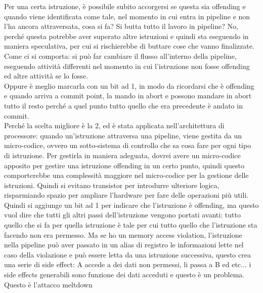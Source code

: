 \documentclass[12pt, oneside]{extbook}
\begin{document}
Per una certa istruzione, è possibile subito accorgersi se questa sia offending e quando viene identificata come tale, nel momento in cui entra in pipeline e non l'ha ancora attraversata, cosa si fa? Si butta tutto il lavoro in pipeline? No, perché questa potrebbe aver superato altre istruzioni e quindi sta eseguendo in maniera speculativa, per cui si rischierebbe di buttare cose che vanno finalizzate. Come ci si comporta: si può far cambiare il flusso all'interno della pipeline, eseguendo attività differenti nel momento in cui l'istruzione non fosse offending ed altre attività se lo fosse.\\ Oppure è meglio marcarla con un bit ad 1, in modo da ricordarsi che è offending e quando arriva a commit point, la mando in abort e possono mandare in abort tutto il resto perché a quel punto tutto quello che era precedente è andato in commit.\\ Perché la scelta migliore è la 2, ed è stata applicata nell'architettura di processore: quando un'istruzione attraversa una pipeline, viene gestita da un micro-codice, ovvero un sotto-sistema di controllo che sa cosa fare per ogni tipo di istruzione. Per gestirla in maniera adeguata, dovrei avere un micro-codice apposito per gestire una istruzione offending in un certo punto, quindi questo comporterebbe una complessità maggiore nel micro-codice per la gestione delle istruzioni. Quindi si evitano transistor per introdurre ulteriore logica, risparmiando spazio per ampliare l'hardware per fare delle operazioni più utili.\\ Quindi si aggiunge un bit ad 1 per indicare che l'istruzione è offending, ma questo vuol dire che tutti gli altri passi dell'istruzione vengono portati avanti: tutto quello che si fa per quella istruzione è tale per cui tutto quello che l'istruzione sta facendo non era permesso. Ma se ho un memory access violation, l'istruzione nella pipeline può aver passato in un alias di registro le informazioni lette nel caso della violazione e può essere letta da una istruzione successiva, questo crea una serie di side effect: A accede a dei dati non permessi, li passa a B ed etc... i side effects generabili sono funzione dei dati acceduti e questo è un problema.\\ Questo è l'attacco meltdown
\end{document}

